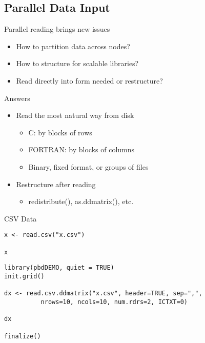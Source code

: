 \subsection{Parallel Data Input}
\makesubcontentsslidessec

\begin{frame}
  \begin{block}{Parallel reading brings new issues}\pause
    \begin{itemize}
    \item How to partition data across nodes?
    \item How to structure for scalable libraries?
    \item Read directly into form needed or restructure?
    \end{itemize}
  \end{block}
  \begin{block}{Answers}\pause
    \begin{itemize}
    \item Read the most natural way from disk
      \begin{itemize}
      \item C: by blocks of rows
      \item FORTRAN: by blocks of columns
      \item Binary, fixed format, or groups of files
      \end{itemize}
    \item Restructure after reading
      \begin{itemize}
      \item redistribute(), as.ddmatrix(), etc.
      \end{itemize}
    \end{itemize}
  \end{block}
\end{frame}



\begin{frame}[fragile]
  \begin{exampleblock}{CSV Data}\pause
\begin{lstlisting}[title=Serial Code]
x <- read.csv("x.csv")

x
\end{lstlisting}

\begin{lstlisting}[title=Parallel Code]
library(pbdDEMO, quiet = TRUE)
init.grid()

dx <- read.csv.ddmatrix("x.csv", header=TRUE, sep=",",
          nrows=10, ncols=10, num.rdrs=2, ICTXT=0)

dx

finalize()
\end{lstlisting}
  \end{exampleblock}
\end{frame}

